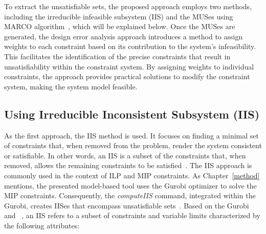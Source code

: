     To extract the unsatisfiable sets, the proposed approach employs two methods, including 
    the irreducible infeasible subsystem (IIS) and the MUSes using MARCO algorithm~\cite{gleeson1990identifying,liffiton2016fast}, which will be explained below. 
    Once the MUSes are generated, the design error analysis approach introduces a method to assign weights to each constraint based on its contribution to the system's infeasibility. This facilitates the identification of the precise constraints that result in unsatisfiability within the constraint system.
    By assigning weights to individual constraints, the approach provides practical solutions to modify the constraint system, making the system model feasible.
    

    
    \subsection{ Using Irreducible Inconsistent Subsystem (IIS)}
    
     As the first approach, the IIS method is used. It focuses on finding a minimal set of constraints that, when removed from the problem, render the system consistent or satisfiable. In other words, an IIS is a subset of the constraints that, when removed, allows the remaining constraints to be satisfied~\cite{gleeson1990identifying}. The IIS approach is commonly used in the context of ILP and MIP constraints. As Chapter~\ref{method} mentions, the presented model-based tool uses the Gurobi optimizer to solve the MIP constraints. Consequently, the \textit{computeIIS} command, integrated within the Gurobi, creates IISes that encompass unsatisfiable sets~\cite{gurobi}.
    Based on the Gurobi~\cite{gurobi} and ~\cite{gleeson1990identifying}, 
    an IIS refers to a subset of constraints and variable limits characterized by the following attributes:

